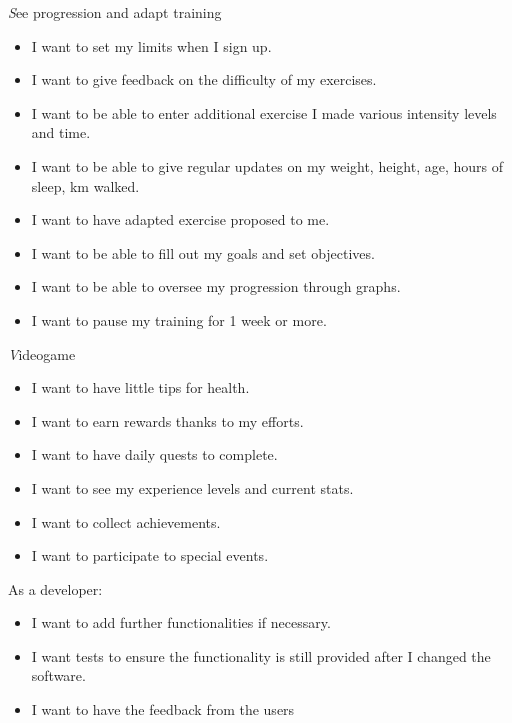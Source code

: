 \documentclass[conference]{IEEEtran}
\begin{document}
\begin{flushleft}
    \textit
    	See progression and adapt training
\end{flushleft}
\begin{itemize}
\item I want to set my limits when I sign up.
\item I want to give feedback on the difficulty of my exercises.
\item I want to be able to enter additional exercise I made various intensity levels and time.
\item I want to be able to give regular updates on my weight, height, age, hours of sleep, km walked.
\item I want to have adapted exercise proposed to me.
\item I want to be able to fill out my goals and set objectives.
\item I want to be able to oversee my progression through graphs.
\item I want to pause my training for 1 week or more.
\end{itemize}

\begin{flushleft}
    \textit
    	Videogame
\end{flushleft}
\begin{itemize}
\item I want to have little tips for health.
\item I want to earn rewards thanks to my efforts.
\item I want to have daily quests to complete.
\item I want to see my experience levels and current stats.
\item I want to collect achievements.
\item I want to participate to special events.
\end{itemize}

\begin{flushleft}
    \br
    As a developer: 
\end{flushleft}
\begin{itemize}
\item I want to add further functionalities if necessary. 
\item I want tests to ensure the functionality is still provided after I changed the software. 
\item I want to have the feedback from the users
\end{itemize}
\end{document}
